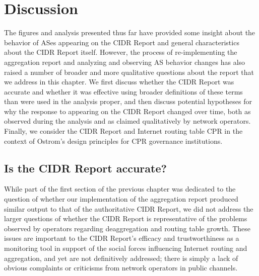 \chapter{Discussion}
\label{chap:discussion}

%

The figures and analysis presented thus far have provided some insight about
the behavior of ASes appearing on the CIDR Report and general characteristics
about the CIDR Report itself. However, the process of re-implementing the
aggregation report and analyzing and observing AS behavior changes has also
raised a number of broader and more qualitative questions about the report
that we address in this chapter. We first discuss whether the CIDR Report was
accurate and whether it was effective using broader definitions of these terms
than were used in the analysis proper, and then discuss potential hypotheses
for why the response to appearing on the CIDR Report changed over time, both as
observed during the analysis and as claimed qualitatively by network operators.
Finally, we consider the CIDR Report and Internet routing table CPR in the
context of Ostrom's design principles for CPR governance institutions.

\section{Is the CIDR Report accurate?}
While part of the first section of the previous chapter was dedicated to the
question of whether our implementation of the aggregation report produced
similar output to that of the authoritative CIDR Report, we did not address the
larger questions of whether the CIDR Report is representative of the problems
observed by operators regarding deaggregation and routing table growth. These
issues are important to the CIDR Report's efficacy and trustworthiness as a
monitoring tool in support of the social forces influencing Internet routing
and aggregation, and yet are not definitively addressed; there is simply a lack
of obvious complaints or criticisms from network operators in public channels.


